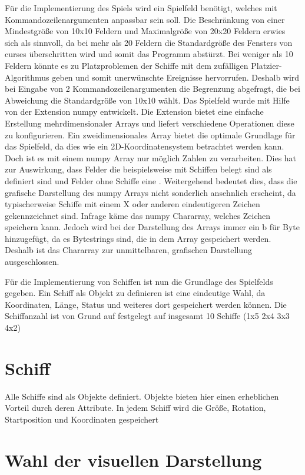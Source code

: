 \documentclass{llncs}
\begin{document}
Für die Implementierung des Spiels wird ein Spielfeld benötigt, welches mit Kommandozeilenargumenten anpassbar sein soll. Die Beschränkung von einer Mindestgröße von 10x10 Feldern und Maximalgröße von 20x20
Feldern erwies sich als sinnvoll, da bei mehr als 20 Feldern die Standardgröße des Fensters von curses überschritten wird und somit das Programm abstürzt. 
Bei weniger als 10 Feldern könnte es zu Platzproblemen der Schiffe mit dem zufälligen Platzier-Algorithmus geben und somit unerwünschte Ereignisse hervorrufen.
Deshalb wird bei Eingabe von 2 Kommandozeilenargumenten die Begrenzung abgefragt, die bei Abweichung die Standardgröße von 10x10 wählt.
Das Spielfeld wurde mit Hilfe von der Extension numpy entwickelt. Die Extension bietet eine einfache Erstellung mehrdimensionaler Arrays und liefert verschiedene Operationen diese zu konfigurieren.
Ein zweidimensionales Array bietet die optimale Grundlage für das Spielfeld, da dies wie ein 2D-Koordinatensystem betrachtet werden kann.
Doch ist es mit einem numpy Array nur möglich Zahlen zu verarbeiten. Dies hat zur Auswirkung, dass Felder die beispielsweise mit Schiffen belegt sind als \grqq{} definiert sind und Felder ohne Schiffe eine \grqq{}.
Weitergehend bedeutet dies, dass die grafische Darstellung des numpy Arrays nicht sonderlich ansehnlich erscheint, da typischerweise Schiffe mit einem \glqq X\grqq{} oder anderen eindeutigeren Zeichen gekennzeichnet sind. 
Infrage käme das numpy Chararray, welches Zeichen speichern kann. Jedoch wird bei der Darstellung des Arrays immer ein \glqq b\grqq{} für Byte hinzugefügt, da es Bytestrings sind, die in dem Array gespeichert werden.
Deshalb ist das Chararray zur unmittelbaren, grafischen Darstellung ausgeschlossen.

Für die Implementierung von Schiffen ist nun die Grundlage des Spielfelds gegeben. Ein Schiff als Objekt zu definieren ist eine eindeutige Wahl, da Koordinaten, Länge, Status und weiteres dort gespeichert werden können.
Die Schiffanzahl ist von Grund auf festgelegt auf insgesamt 10 Schiffe (1x5 2x4 3x3 4x2)

\section{Schiff}

Alle Schiffe sind als Objekte definiert. Objekte bieten hier einen erheblichen Vorteil durch deren Attribute.
In jedem Schiff wird die Größe, Rotation, Startposition und Koordinaten gespeichert

\section{Wahl der visuellen Darstellung}
\end{document}

